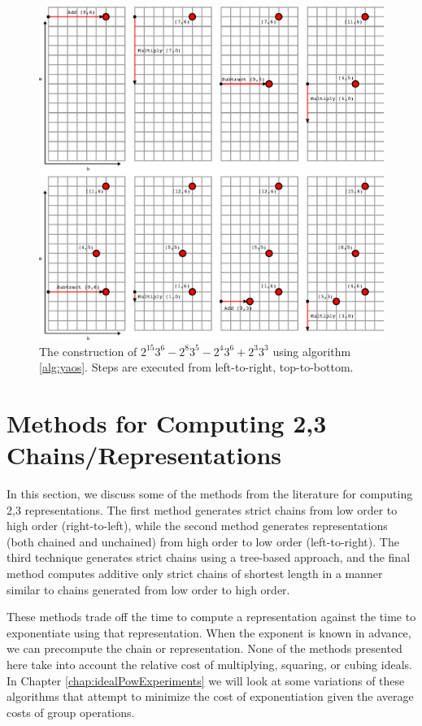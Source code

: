 \documentclass{ucalgthes1}
\theoremstyle{definition}
\begin{document}
\begin{figure}[H]
\centering
\includegraphics{yao1}
\caption{The construction of $2^{15} 3^6 - 2^8 3^5 - 2^4 3^6 + 2^3 3^3$ using algorithm \ref{alg:yaos}.  Steps are executed from left-to-right, top-to-bottom.}
\label{fig:yao1}
\end{figure}


\bigbreak
\section{Methods for Computing 2,3 Chains/Representations}
\label{sec:dbnsMethods}

In this section, we discuss some of the methods from the literature for computing 2,3 representations. The first method generates strict chains from low order to high order (right-to-left), while the second method generates representations (both chained and unchained) from high order to low order (left-to-right).  The third technique generates strict chains using a tree-based approach, and the final method computes additive only strict chains of shortest length in a manner similar to chains generated from low order to high order.  

These methods trade off the time to compute a representation against the time to exponentiate using that representation.  When the exponent is known in advance, we can precompute the chain or representation.  None of the methods presented here take into account the relative cost of multiplying, squaring, or cubing ideals.  In Chapter \ref{chap:idealPowExperiments} we will look at some variations of these algorithms that attempt to minimize the cost of exponentiation given the average costs of group operations.
\end{document}
